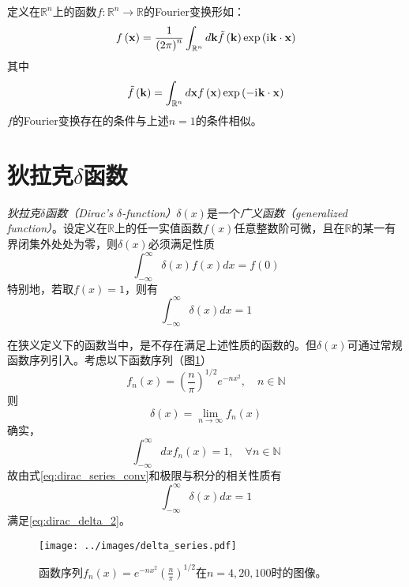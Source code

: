 \documentclass[main.tex]{subfiles}
\begin{document}
定义在$\mathbb{R}^n$上的函数$f:\mathbb{R}^n\rightarrow\mathbb{R}$的Fourier变换形如：
\begin{equation}\label{eq:fourier_transform_2}
    f\left(\mathbf{x}\right)=\frac{1}{\left(2\pi\right)^n}\int_{\mathbb{R}^n}d\mathbf{k}\tilde{f}\left(\mathbf{k}\right)\exp\left(\mathrm{i}\mkern1mu \mathbf{k}\cdot\mathbf{x}\right)
\end{equation}
其中
\[\tilde{f}\left(\mathbf{k}\right)=\int_{\mathbb{R}^n}d\mathbf{x}f\left(\mathbf{x}\right)\exp\left(-\mathrm{i}\mkern1mu\mathbf{k}\cdot\mathbf{x}\right)\]
$f$的Fourier变换存在的条件与上述$n=1$的条件相似。

\section{狄拉克$\delta$函数}
\emph{狄拉克$\delta$函数（Dirac's $\delta$-function）}$\delta\left(x\right)$是一个\emph{广义函数（generalized function）}。设定义在$\mathbb{R}$上的任一实值函数$f\left(x\right)$任意整数阶可微，且在$\mathbb{R}$的某一有界闭集外处处为零，则$\delta\left(x\right)$必须满足性质
\begin{equation}\label{eq:dirac_delta_1}
    \int_{-\infty}^{\infty}\delta\left(x\right)f\left(x\right)dx=f\left(0\right)
\end{equation}
特别地，若取$f\left(x\right)=1$，则有
\begin{equation}\label{eq:dirac_delta_2}
    \int_{-\infty}^\infty\delta\left(x\right)dx=1
\end{equation}

在狭义定义下的函数当中，是不存在满足上述性质的函数的。但$\delta\left(x\right)$可通过常规函数序列引入。考虑以下函数序列（图\ref{fig:delta_series}）
\[f_n\left(x\right)=\left(\frac{n}{\pi}\right)^{1/2}e^{-nx^2},\quad n\in\mathbb{N}\]
则
\begin{equation}\label{eq:dirac_series_conv}
    \delta\left(x\right)=\lim_{n\to\infty}f_n\left(x\right)
\end{equation}
确实，
\[\int_{-\infty}^{\infty}dxf_n\left(x\right)=1,\quad\forall n\in\mathbb{N}\]
故由式\eqref{eq:dirac_series_conv}和极限与积分的相关性质有
\[\int_{-\infty}^\infty\delta\left(x\right)dx=1\]
满足\eqref{eq:dirac_delta_2}。

\begin{figure}[htbp]
    \centering
    \texttt{[image: ../images/delta\_series.pdf]}
    \caption{函数序列$f_n\left(x\right)=e^{-nx^2}\left(\frac{n}{\pi}\right)^{1/2}$在$n=4,20,100$时的图像\cite{lighthill_1958}。}
    \label{fig:delta_series}
\end{figure}
\end{document}
